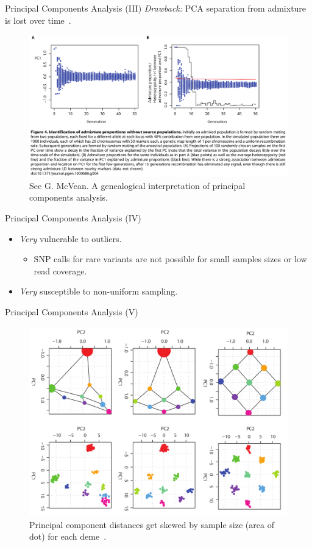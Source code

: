 \documentclass{beamer}
\begin{document}
\begin{frame}{Principal Components Analysis (III)}
  \textit{Drawback:} PCA separation from admixture is lost over
  time~\cite{mcvean_genealogical_2009}.
  \begin{figure}
    \includegraphics[width=\linewidth,keepaspectratio]{../Figures/fig1.png}
    \caption{See G. McVean. A genealogical interpretation of principal
    components analysis.}
  \end{figure}
\end{frame}

\begin{frame}{Principal Components Analysis (IV)}
  \begin{itemize}
    \item \textit{Very} vulnerable to outliers.
      \begin{itemize}
        \item SNP calls for rare variants are not possible for small samples
          sizes or low read coverage.
      \end{itemize}
    \item \textit{Very} susceptible to non-uniform sampling.
  \end{itemize}
\end{frame}

\begin{frame}{Principal Components Analysis (V)}
  \begin{figure}
    \includegraphics[width=.9\linewidth,keepaspectratio]{../Figures/fig2.png}
    \caption{Principal component distances get skewed by sample size (area of
      dot) for each deme~\cite{mcvean_genealogical_2009}.}
  \end{figure}
\end{frame}
\end{document}

